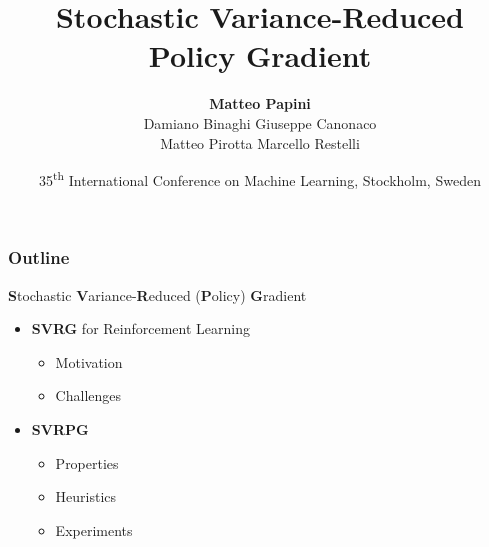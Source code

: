 \documentclass[aspectratio=169]{beamer}
\title{Stochastic Variance-Reduced Policy Gradient}
\date[ICML 2018]{\small{35\textsuperscript{th} International Conference on Machine Learning, Stockholm, Sweden}}
\author[Papini et al.]{\textbf{Matteo Papini} \\
						\small{Damiano Binaghi \quad Giuseppe Canonaco \\
								Matteo Pirotta \quad Marcello Restelli}}
\newcommand{\enb}[1]{\textcolor{poliblue1}{\textbf{#1}}}
\newcommand{\soft}[1]{\textcolor{softblue}{#1}}
\begin{document}

\begin{frame}
\titlepage
\end{frame}

\begin{frame} 
\frametitle{Outline} 
\begin{center}
	\Large{\enb{S}\soft{tochastic}
		\enb{V}\soft{ariance-}}\enb{R}\soft{educed}
	\soft{(}\enb{P}\soft{olicy}\soft{)}
	\enb{G}\soft{radient}
\end{center}


\begin{itemize}
	\item \enb{SVRG} for Reinforcement Learning
		\begin{itemize}
		\item Motivation
		\item Challenges
	\end{itemize}
	\item \enb{SVRPG}
	\begin{itemize}
		\item Properties
		\item Heuristics
		\item Experiments
	\end{itemize}
\end{itemize}

\end{frame}
\end{document}
